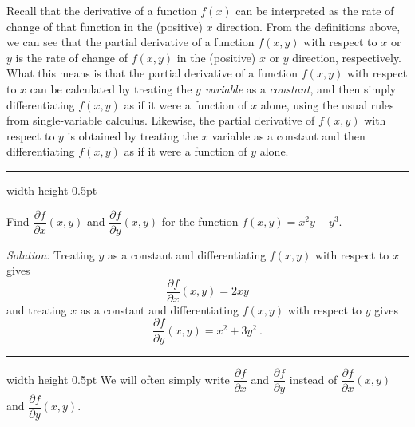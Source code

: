 
Recall that the derivative of a function $f(x)$ can be interpreted as the rate of change of that function in the
(positive) $x$ direction. 
From the definitions above, we can see that the partial derivative of a function $f(x,y)$ with respect to $x$ or $y$ is the rate of change of $f(x,y)$ in the (positive) $x$ or $y$ direction,
respectively. What this means is that the partial derivative of a function $f(x,y)$ with respect to $x$ can be
calculated by treating the $y$ \emph{variable} as a \emph{constant}, and then simply differentiating $f(x,y)$ as if it
were a function of $x$ alone, using the usual rules from single-variable calculus. Likewise, the partial derivative of
$f(x,y)$ with respect to $y$ is obtained by treating the $x$ variable as a constant and then differentiating $f(x,y)$
as if it were a function of $y$ alone.

\vspace{4mm}
\hrule width \textwidth height 0.5pt
\begin{exmp}
 Find $\dfrac{\partial f}{\partial x} (x,y)$ and $\dfrac{\partial f}{\partial y} (x,y)$ for the function
 $f(x,y) = x^{2}y + y^3$.\vspace{1mm}
 \par\noindent\emph{Solution:} Treating $y$ as a constant and differentiating $f(x,y)$ with respect to $x$ gives
 \begin{displaymath}
  \dfrac{\partial f}{\partial x} (x,y) = 2xy
 \end{displaymath}
 and treating $x$ as a constant and differentiating $f(x,y)$ with respect to $y$ gives
 \begin{displaymath}
  \dfrac{\partial f}{\partial y} (x,y) = x^2 + 3y^2 ~.
 \end{displaymath}
\end{exmp}
\hrule width \textwidth height 0.5pt
\newpage
We will often simply write $\dfrac{\partial f}{\partial x}$ and $\dfrac{\partial f}{\partial y}$ instead of
$\dfrac{\partial f}{\partial x} (x,y)$ and $\dfrac{\partial f}{\partial y} (x,y)$.


